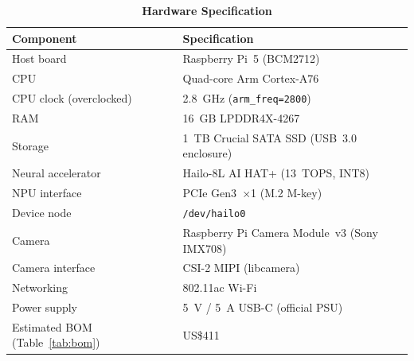 \documentclass{ieeeaccess}
\begin{document}
\begin{table}[ht!]
\caption{\textbf{Hardware Specification}}
\label{tab:hw_specs}
\setlength{\tabcolsep}{3pt}
\centering\footnotesize
\begin{tabular}{|l|p{4.0cm}|}
\hline
\textbf{Component} & \textbf{Specification} \\
\hline
Host board & Raspberry Pi~5 (BCM2712) \\
CPU & Quad-core Arm Cortex-A76 \\
CPU clock (overclocked) & 2.8~GHz (\texttt{arm\_freq=2800}) \\
RAM & 16~GB LPDDR4X-4267 \\
Storage & 1~TB Crucial SATA SSD (USB~3.0 enclosure) \\
Neural accelerator & Hailo-8L AI HAT+ (13~TOPS, INT8) \\
NPU interface & PCIe Gen3~$\times$1 (M.2 M-key) \\
Device node & \texttt{/dev/hailo0} \\
Camera & Raspberry Pi Camera Module~v3 (Sony IMX708) \\
Camera interface & CSI-2 MIPI (libcamera) \\
Networking & 802.11ac Wi-Fi \\
Power supply & 5~V / 5~A USB-C (official PSU) \\
Estimated BOM (Table~\ref{tab:bom}) & US\$411 \\
\hline
\end{tabular}
\end{table}
\end{document}
